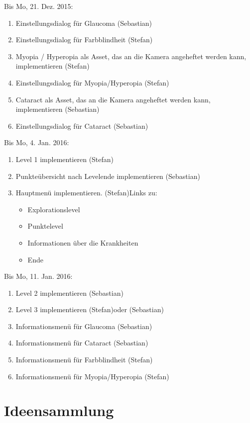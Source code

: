 \documentclass[a4paper, 11pt]{scrartcl}
\newcommand{\entwickler}[1]{\textcolor{BurntOrange}{(#1)}}
\newcommand{\Stefan}{\entwickler{Stefan}}
\newcommand{\Sebastian}{\entwickler{Sebastian}}
\begin{document}
Bis Mo, 21. Dez. 2015:
\begin{enumerate}
    \item Einstellungsdialog für Glaucoma \Sebastian
    \item Einstellungsdialog für Farbblindheit \Stefan
    \item Myopia / Hyperopia als Asset, das an die Kamera angeheftet werden kann, implementieren \Stefan
    \item Einstellungsdialog für Myopia/Hyperopia \Stefan
    \item Cataract als Asset, das an die Kamera angeheftet werden kann, implementieren \Sebastian
    \item Einstellungsdialog für Cataract \Sebastian
\end{enumerate}
Bis Mo, 4. Jan. 2016:
\begin{enumerate}
    \item Level 1 implementieren \Stefan
    \item Punkteübersicht nach Levelende implementieren \Sebastian
    \item Hauptmenü implementieren. \Stefan Links zu:
        \begin{itemize}
        \item Explorationslevel
        \item Punktelevel
        \item Informationen über die Krankheiten
        \item Ende
    \end{itemize}
\end{enumerate}
Bis Mo, 11. Jan. 2016:
\begin{enumerate}
    \item Level 2 implementieren \Sebastian
    \item Level 3 implementieren \Stefan oder \Sebastian
    \item Informationsmenü für Glaucoma \Sebastian
    \item Informationsmenü für Cataract \Sebastian
    \item Informationsmenü für Farbblindheit \Stefan
    \item Informationsmenü für Myopia/Hyperopia \Stefan
\end{enumerate}


\section{Ideensammlung}
\end{document}
